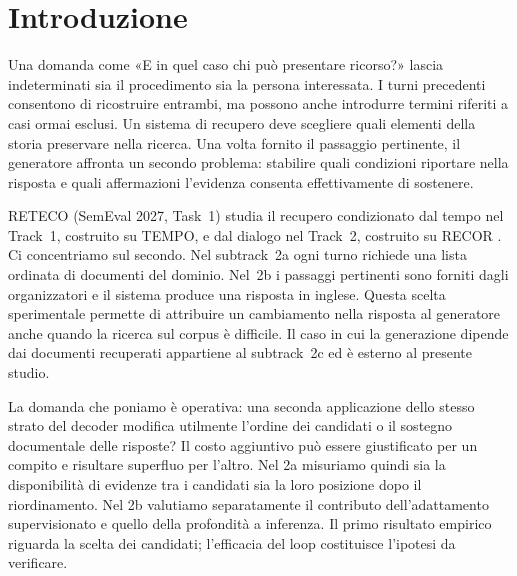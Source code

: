 \section{Introduzione}
Una domanda come «E in quel caso chi può presentare ricorso?» lascia indeterminati sia il procedimento sia la persona interessata. I turni precedenti consentono di ricostruire entrambi, ma possono anche introdurre termini riferiti a casi ormai esclusi. Un sistema di recupero deve scegliere quali elementi della storia preservare nella ricerca. Una volta fornito il passaggio pertinente, il generatore affronta un secondo problema: stabilire quali condizioni riportare nella risposta e quali affermazioni l'evidenza consenta effettivamente di sostenere.

RETECO (SemEval 2027, Task~1) studia il recupero condizionato dal tempo nel Track~1, costruito su TEMPO, e dal dialogo nel Track~2, costruito su RECOR \cite{reteco,recor}. Ci concentriamo sul secondo. Nel subtrack~2a ogni turno richiede una lista ordinata di documenti del dominio. Nel~2b i passaggi pertinenti sono forniti dagli organizzatori e il sistema produce una risposta in inglese. Questa scelta sperimentale permette di attribuire un cambiamento nella risposta al generatore anche quando la ricerca sul corpus è difficile. Il caso in cui la generazione dipende dai documenti recuperati appartiene al subtrack~2c ed è esterno al presente studio.

La domanda che poniamo è operativa: una seconda applicazione dello stesso strato del decoder modifica utilmente l'ordine dei candidati o il sostegno documentale delle risposte? Il costo aggiuntivo può essere giustificato per un compito e risultare superfluo per l'altro. Nel 2a misuriamo quindi sia la disponibilità di evidenze tra i candidati sia la loro posizione dopo il riordinamento. Nel 2b valutiamo separatamente il contributo dell'adattamento supervisionato e quello della profondità a inferenza. Il primo risultato empirico riguarda la scelta dei candidati; l'efficacia del loop costituisce l'ipotesi da verificare.
